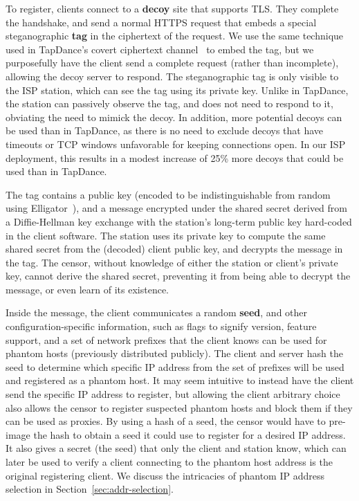 \documentclass[sigconf,anonymous]{acmart}
\begin{document}
\medskip

To register, clients connect to a \textbf{decoy} site that supports TLS. They
complete the handshake, and send a normal HTTPS request that embeds a special
steganographic \textbf{tag} in the ciphertext of the request. We use
the same technique used in TapDance's covert ciphertext
channel~\cite[\S3]{tapdance14}
to embed the tag, but we purposefully have the client
send a complete request (rather than incomplete), allowing the decoy server to respond.
The steganographic tag is only visible to the ISP station, which can see the tag using its
private key. Unlike in TapDance, the \scheme station can passively observe
the tag, and does not need to respond to it, obviating the need to mimick the decoy.
In addition, more potential decoys can be used than in TapDance, as
there is no need to exclude decoys that have timeouts or TCP windows unfavorable
for keeping connections open. In our ISP deployment, this results in a modest increase
of 25\% more decoys that could be used than in TapDance.


The tag contains a public key (encoded to be indistinguishable from random using
Elligator~\cite{elligator}), and a message encrypted under the shared secret
derived from a Diffie-Hellman key exchange with the station's long-term public key hard-coded
in the client software. The station uses its private key to compute the same
shared secret from the (decoded) client public key, and decrypts the message in the
tag. The censor, without knowledge of either the station or client's private
key, cannot derive the shared secret, preventing it from being able to decrypt
the message, or even learn of its existence.


Inside the message, the client communicates a random \textbf{seed}, and other
configuration-specific information, such as flags to signify version, feature
support, and a set of network prefixes that the client knows can be used
for phantom hosts (previously distributed publicly).
The client and server hash the seed to determine which specific
IP address from the set of prefixes will be used and registered as a phantom host.
It may seem intuitive to instead have the client
send the specific IP address to register, but allowing the client arbitrary
choice also allows the censor to register suspected phantom hosts and block them if
they can be used as proxies.
By using a hash of a seed, the censor would have to pre-image the hash to
obtain a seed it could use to register for a desired IP address.
It also gives a
secret (the seed) that only the client and station know, which can
later be used to verify a client connecting to the phantom host address is the
original registering client.
We discuss the intricacies of phantom IP address selection in
Section~\ref{sec:addr-selection}.
\end{document}
